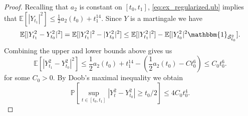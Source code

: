 \documentclass[10pt,a4paper]{amsart}
\def\E{{\mathbb E}}
\def\P{{\mathbb P}}
\newcommand{\Scc}{\hat{\mathcal S}}
\begin{document}
\begin{proof}
    Recalling that $a_2$ is constant on $[t_0,t_1]$, \eqref{eq:ex_regularized.ub} implies that $\E[|Y_{t_1}|^2] \leq \frac12 a_2(t_0) + t_1^{14}$.
    Since $Y$ is a martingale we have
    \begin{equation}
    	 \E[|Y_{t_1}^2 - Y^2_{t_0}|^2] = \E[|Y_{t_1}^2|^2 - |Y_{t_0}^2|^2] \le \E[|Y_{t_1}^2|^2] - \E[|Y_{t_0}^2|^2\mathbbm{1}_{\Scc_{t_0}^2}].
    \end{equation}
    Combining the upper and lower bounds above gives us
    \begin{equation}
        \label{eq:ex_regularized.claim1}
        \E[|Y_{t_1}^2 - Y^2_{t_0}|^2] \le \frac12 a_2(t_0) + t_1^{14} - \!\left(\frac12 a_2(t_0) - Ct_0^6\right)\! \le C_0 t_0^6.
    \end{equation}
    for some $C_0 > 0$.
    By Doob's maximal inequality we obtain
    \begin{equation}
        \label{eq:ex_regularized.2_Doob1}
        \P[\sup_{t \in [t_0,t_1]} |Y^2_t - Y_{t_0}^2| \ge t_0 / 2] \le 4 C_0 t^4_0.
    \end{equation}


\end{proof}
\end{document}
